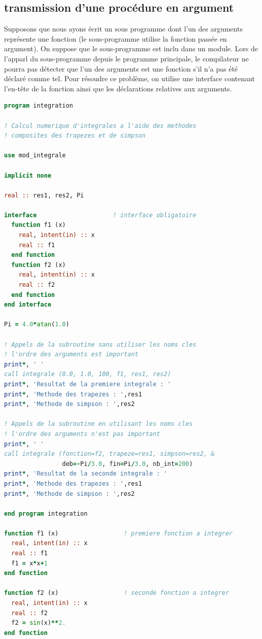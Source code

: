 \documentclass[a4paper,twoside]{article}
\begin{document}
\subsection{transmission d'une procédure en argument}
Supposons que nous ayons écrit un sous programme dont l'un des arguments représente une fonction (le sous-programme utilise la fonction passée en argument). On suppose que le sous-programme est inclu dans un module. Lors de l'apparl du sous-programme depuis le programme principale, le compilateur ne pourra pas détecter que l'un des arguments est une fonction s'il n'a pas été déclaré comme tel. Pour résoudre ce problème, on utilise une interface contenant l'en-tête de la fonction ainsi que les déclarations relatives aux arguments. 
\begin{lstlisting}[language=Fortran]
program integration

! Calcul numerique d'integrales a l'aide des methodes
! composites des trapezes et de simpson

use mod_integrale

implicit none

real :: res1, res2, Pi

interface                     ! interface obligatoire
  function f1 (x)
    real, intent(in) :: x
    real :: f1
  end function
  function f2 (x)
    real, intent(in) :: x
    real :: f2
  end function
end interface

Pi = 4.0*atan(1.0)

! Appels de la subroutine sans utiliser les noms cles
! l'ordre des arguments est important
print*, ' '
call integrale (0.0, 1.0, 100, f1, res1, res2)
print*, 'Resultat de la premiere integrale : '
print*, 'Methode des trapezes : ',res1
print*, 'Methode de simpson : ',res2

! Appels de la subroutine en utilisant les noms cles
! l'ordre des arguments n'est pas important
print*, ' '
call integrale (fonction=f2, trapeze=res1, simpson=res2, &
                deb=-Pi/3.0, fin=Pi/3.0, nb_int=200)
print*, 'Resultat de la seconde integrale : '
print*, 'Methode des trapezes : ',res1
print*, 'Methode de simpson : ',res2

end program integration

function f1 (x)                  ! premiere fonction a integrer
  real, intent(in) :: x
  real :: f1
  f1 = x*x+1
end function

function f2 (x)                  ! seconde fonction a integrer
  real, intent(in) :: x
  real :: f2
  f2 = sin(x)**2.
end function
\end{lstlisting}
\end{document}
